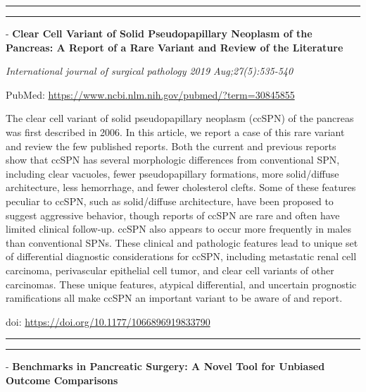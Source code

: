 \documentclass[]{article}
\begin{document}
{}

\begin{center}\rule{0.5\linewidth}{\linethickness}\end{center}

\begin{center}\rule{0.5\linewidth}{\linethickness}\end{center}

 - \textbf{Clear Cell Variant of Solid Pseudopapillary Neoplasm of the
Pancreas: A Report of a Rare Variant and Review of the Literature}

\emph{International journal of surgical pathology 2019
Aug;27(5):535-540}

PubMed: \url{https://www.ncbi.nlm.nih.gov/pubmed/?term=30845855}

The clear cell variant of solid pseudopapillary neoplasm (ccSPN) of the
pancreas was first described in 2006. In this article, we report a case
of this rare variant and review the few published reports. Both the
current and previous reports show that ccSPN has several morphologic
differences from conventional SPN, including clear vacuoles, fewer
pseudopapillary formations, more solid/diffuse architecture, less
hemorrhage, and fewer cholesterol clefts. Some of these features
peculiar to ccSPN, such as solid/diffuse architecture, have been
proposed to suggest aggressive behavior, though reports of ccSPN are
rare and often have limited clinical follow-up. ccSPN also appears to
occur more frequently in males than conventional SPNs. These clinical
and pathologic features lead to unique set of differential diagnostic
considerations for ccSPN, including metastatic renal cell carcinoma,
perivascular epithelial cell tumor, and clear cell variants of other
carcinomas. These unique features, atypical differential, and uncertain
prognostic ramifications all make ccSPN an important variant to be aware
of and report.

doi: \url{https://doi.org/10.1177/1066896919833790}

{}

{}

\begin{center}\rule{0.5\linewidth}{\linethickness}\end{center}

\begin{center}\rule{0.5\linewidth}{\linethickness}\end{center}

 - \textbf{Benchmarks in Pancreatic Surgery: A Novel Tool for Unbiased
Outcome Comparisons}
\end{document}
